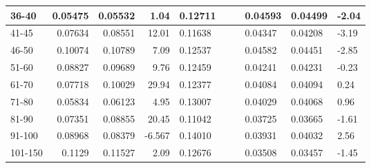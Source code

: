 \begin{table*}[h!]
\begin{tabular}{|l|r|r|r||l|r|r||l|l|l|}
        36-40   & 0.05475                                 & 0.05532                        & 1.04                             & 0.12711                    &                          &                            & 0.04593 & 0.04499                & -2.04                  \\ \hline
        41-45   & 0.07634                                 & 0.08551                        & 12.01                            & 0.11638                    &                          &                            & 0.04347 & 0.04208                & -3.19                  \\ \hline
        46-50   & 0.10074                                 & 0.10789                        & 7.09                             & 0.12537                    &                          &                            & 0.04582 & 0.04451                & -2.85                  \\ \hline
        51-60   & 0.08827                                 & 0.09689                        & 9.76                             & 0.12459                    &                          &                            & 0.04241 & 0.04231                & -0.23                  \\ \hline
        61-70   & 0.07718                                 & 0.10029                        & 29.94                            & 0.12377                    &                          &                            & 0.04084 & 0.04094                & 0.24                   \\ \hline
        71-80   & 0.05834                                 & 0.06123                        & 4.95                             & 0.13007                    &                          &                            & 0.04029 & 0.04068                & 0.96                   \\ \hline
        81-90   & 0.07351                                 & 0.08855                        & 20.45                            & 0.11042                    &                          &                            & 0.03725 & 0.03665                & -1.61                  \\ \hline
        91-100  & 0.08968                                 & 0.08379                        & -6.567                           & 0.14010                    &                          &                            & 0.03931 & 0.04032                & 2.56                   \\ \hline
        101-150 & 0.1129                                  & 0.11527                        & 2.09                             & 0.12676                    &                          &                            & 0.03508 & 0.03457                & -1.45                  \\ \hline

\end{tabular}
\end{table*}
